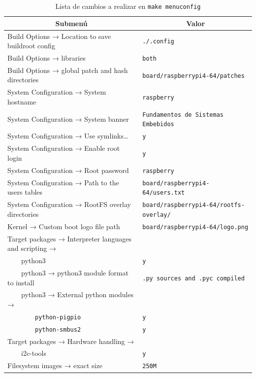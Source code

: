 \begin{table}
	\caption{Lista de cambios a realizar en \texttt{make menuconfig}}
	\label{tbl:menuconfig-changes}
	\centering
	\begin{tabularx}{\columnwidth}{X l}
	\toprule
	\multicolumn{1}{c}{\textbf{Submenú}}                   &
	\multicolumn{1}{c}{\textbf{Valor}} \\
	\midrule
		Build Options → Location to save buildroot config & \texttt{./.config} \\
		Build Options → libraries                         & \texttt{both} \\
		Build Options → global patch and hash directories & \texttt{board/raspberrypi4-64/patches} \\[2mm]

		System Configuration → System hostname            & \texttt{raspberry} \\
		System Configuration → System banner              & \texttt{Fundamentos de Sistemas Embebidos} \\
		System Configuration → Use symlinks\dots{}        & \texttt{y} \\
		System Configuration → Enable root login          & \texttt{y} \\
		System Configuration → Root password              & \texttt{raspberry} \\
		System Configuration → Path to the users tables   & \texttt{board/raspberrypi4-64/users.txt} \\
		System Configuration → RootFS overlay directories & \texttt{board/raspberrypi4-64/rootfs-overlay/} \\[2mm]

		Kernel → Custom boot logo file path               & \texttt{board/raspberrypi4-64/logo.png} \\[2mm]

		Target packages → Interpreter languages and scripting → \\
		~~~~python3                                       & \texttt{y} \\
		~~~~python3 → python3 module format to install    & \texttt{.py sources and .pyc compiled} \\
		~~~~python3 → External python modules → \\
		~~~~~~~~\texttt{python-pigpio}                    & \texttt{y} \\
		~~~~~~~~\texttt{python-smbus2}                    & \texttt{y} \\[2mm]
		Target packages → Hardware handling →             \\
		~~~~i2c-tools                                     & \texttt{y} \\

		Filesystem images → exact size                    & \texttt{250M} \\[2mm]
	\bottomrule
	\end{tabularx}
\end{table}


